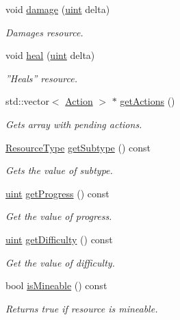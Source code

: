 \begin{DoxyCompactItemize}
void \hyperlink{classResource_aaba80262d4086bfce08ea4d4c0d63f75}{damage} (\hyperlink{BasicTypes_8h_a91ad9478d81a7aaf2593e8d9c3d06a14}{uint} delta)
\begin{DoxyCompactList}\small\item\em Damages resource. \end{DoxyCompactList}\item 
void \hyperlink{classResource_a88928f89a1a538768dade43b0493ec6c}{heal} (\hyperlink{BasicTypes_8h_a91ad9478d81a7aaf2593e8d9c3d06a14}{uint} delta)
\begin{DoxyCompactList}\small\item\em ''Heals'' resource. \end{DoxyCompactList}\item 
std\-::vector$<$ \hyperlink{classAction}{Action} $>$ $\ast$ \hyperlink{classResource_a4c4cc169461d76de8787c97276665168}{get\-Actions} ()
\begin{DoxyCompactList}\small\item\em Gets array with pending actions. \end{DoxyCompactList}\item 
\hyperlink{BasicTypes_8h_a8571efa4409be32e28abf3ea74a0dbb1}{Resource\-Type} \hyperlink{classResource_ae3b7847e943a7b82f90bcf32ecd1e797}{get\-Subtype} () const 
\begin{DoxyCompactList}\small\item\em Gets the value of subtype. \end{DoxyCompactList}\item 
\hyperlink{BasicTypes_8h_a91ad9478d81a7aaf2593e8d9c3d06a14}{uint} \hyperlink{classResource_a512a227f9ddfaf59d40cf878dbf6c937}{get\-Progress} () const 
\begin{DoxyCompactList}\small\item\em Get the value of progress. \end{DoxyCompactList}\item 
\hyperlink{BasicTypes_8h_a91ad9478d81a7aaf2593e8d9c3d06a14}{uint} \hyperlink{classResource_a0b6ea6582c309b2db3c57274b687e7d2}{get\-Difficulty} () const 
\begin{DoxyCompactList}\small\item\em Get the value of difficulty. \end{DoxyCompactList}\item 
bool \hyperlink{classResource_ad87877637e96514ddefed5cae8adaa99}{is\-Mineable} () const 
\begin{DoxyCompactList}\small\item\em Returns true if resource is mineable. \end{DoxyCompactList}\end{DoxyCompactItemize}
